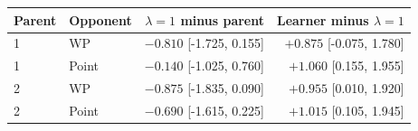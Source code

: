 \begin{tabular}{llrr}
\toprule
Parent & Opponent & $\lambda=1$ minus parent & Learner minus $\lambda=1$ \\
\midrule
1 & WP & $-0.810$ [-1.725, 0.155] & $+0.875$ [-0.075, 1.780] \\
1 & Point & $-0.140$ [-1.025, 0.760] & $+1.060$ [0.155, 1.955] \\
2 & WP & $-0.875$ [-1.835, 0.090] & $+0.955$ [0.010, 1.920] \\
2 & Point & $-0.690$ [-1.615, 0.225] & $+1.015$ [0.105, 1.945] \\
\bottomrule
\end{tabular}
